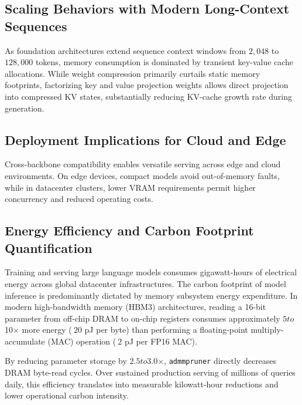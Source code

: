 \subsection{Scaling Behaviors with Modern Long-Context Sequences}
As foundation architectures extend sequence context windows from $2{,}048$ to $128{,}000$ tokens, memory consumption is dominated by transient key-value cache allocations. While weight compression primarily curtails static memory footprints, factorizing key and value projection weights allows direct projection into compressed KV states, substantially reducing KV-cache growth rate during generation.

\subsection{Deployment Implications for Cloud and Edge}
Cross-backbone compatibility enables versatile serving across edge and cloud environments. On edge devices, compact models avoid out-of-memory faults, while in datacenter clusters, lower VRAM requirements permit higher concurrency and reduced operating costs.

\subsection{Energy Efficiency and Carbon Footprint Quantification}
Training and serving large language models consumes gigawatt-hours of electrical energy across global datacenter infrastructures. The carbon footprint of model inference is predominantly dictated by memory subsystem energy expenditure. In modern high-bandwidth memory (HBM3) architectures, reading a 16-bit parameter from off-chip DRAM to on-chip registers consumes approximately $5$\times$ to $10$\times$ more energy ($~20$ pJ per byte) than performing a floating-point multiply-accumulate (MAC) operation ($~2$ pJ per FP16 MAC).

By reducing parameter storage by $2.5$\times$ to $3.0$\times$, \texttt{admmpruner} directly decreases DRAM byte-read cycles. Over sustained production serving of millions of queries daily, this efficiency translates into measurable kilowatt-hour reductions and lower operational carbon intensity.
